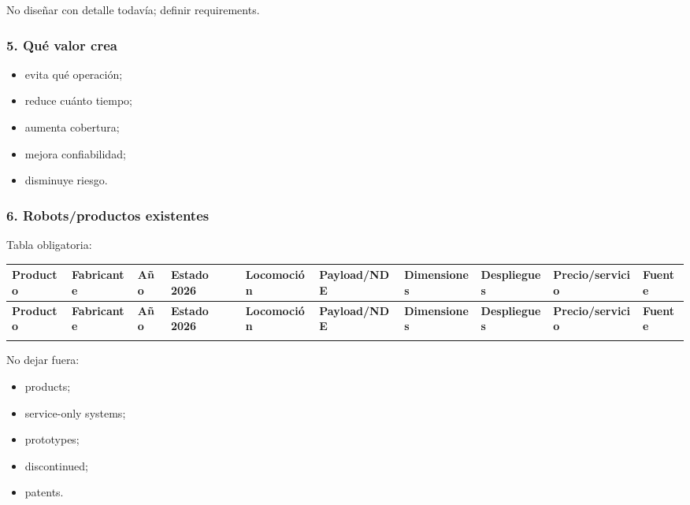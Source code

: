 \documentclass[11pt,a4paper]{article}
\newlength{\colw}
\begin{document}
No diseñar con detalle todavía; definir requirements.


\subsubsection*{5. Qué valor crea}
\begin{itemize}
\item evita qué operación;
\item reduce cuánto tiempo;
\item aumenta cobertura;
\item mejora confiabilidad;
\item disminuye riesgo.
\end{itemize}


\subsubsection*{6. Robots/productos existentes}
Tabla obligatoria:

\begin{landscape}
\begingroup\footnotesize
\setlength{\tabcolsep}{2pt}
\setlength{\emergencystretch}{3em}
 
\setlength{\colw}{\dimexpr(\linewidth-20\tabcolsep)/10\relax}
\begin{longtable}{@{}L L L L L L L L L L@{}}
\toprule
\textbf{Producto} & \textbf{Fabricante} & \textbf{Año} & \textbf{Estado 2026} & \textbf{Locomoción} & \textbf{Payload\slash NDE} & \textbf{Dimensiones} & \textbf{Despliegues} & \textbf{Precio\slash servicio} & \textbf{Fuente} \\
\midrule
\endfirsthead
\toprule
\textbf{Producto} & \textbf{Fabricante} & \textbf{Año} & \textbf{Estado 2026} & \textbf{Locomoción} & \textbf{Payload\slash NDE} & \textbf{Dimensiones} & \textbf{Despliegues} & \textbf{Precio\slash servicio} & \textbf{Fuente} \\
\midrule
\endhead
\bottomrule
\endfoot
{} \\
\end{longtable}
\endgroup
\end{landscape}

No dejar fuera:

\begin{itemize}
\item products;
\item service-only systems;
\item prototypes;
\item discontinued;
\item patents.
\end{itemize}
\end{document}
